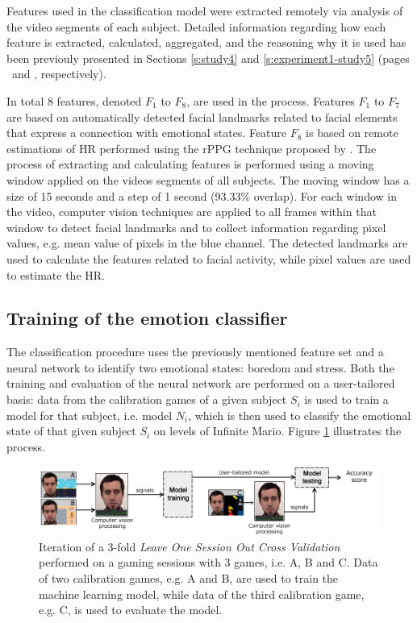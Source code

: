 Features used in the classification model were extracted remotely via analysis of the video segments of each subject. Detailed information regarding how each feature is extracted, calculated, aggregated, and the reasoning why it is used has been previouly presented in Sections \ref{s:study4} and \ref{s:experiment1-study5} (pages \pageref{s:study4}\ and \pageref{s:experiment1-study5}, respectively).

In total 8 features, denoted $F_1$ to $F_8$, are used in the process. Features $F_1$ to $F_7$ are based on automatically detected facial landmarks related to facial elements that express a connection with emotional states. Feature $F_8$ is based on remote estimations of HR performed using the rPPG technique proposed by \textcite{poh2011advancements}. The process of extracting and calculating features is performed using a moving window applied on the videos segments of all subjects. The moving window has a size of 15 seconds and a step of 1 second (93.33\% overlap). For each window in the video, computer vision techniques are applied to all frames within that window to detect facial landmarks and to collect information regarding pixel values, e.g. mean value of pixels in the blue channel. The detected landmarks are used to calculate the features related to facial activity, while pixel values are used to estimate the HR.

\subsection{Training of the emotion classifier}

The classification procedure uses the previously mentioned feature set and a neural network to identify two emotional states: boredom and stress. Both the training and evaluation of the neural network are performed on a user-tailored basis: data from the calibration games of a given subject $S_i$ is used to train a model for that subject, i.e. model $N_i$, which is then used to classify the emotional state of that given subject $S_i$ on levels of Infinite Mario. Figure \ref{fig:experiment2-training-evaluation} illustrates the process. 

\begin{figure}[ht]
    \centering
    \includegraphics[width=\textwidth]{figures/machine-learning-investigation.png}
    \caption{Iteration of a 3-fold \textit{Leave One Session Out Cross Validation} performed on a gaming sessions with 3 games, i.e. A, B and C. Data of two calibration games, e.g. A and B, are used to train the machine learning model, while data of the third calibration game, e.g. C, is used to evaluate the model.}
    \label{fig:experiment2-training-evaluation}
\end{figure}

